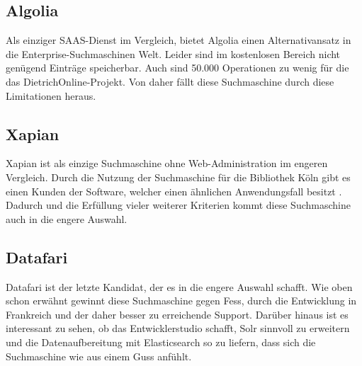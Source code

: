 \subsection{Algolia}

Als einziger SAAS-Dienst im Vergleich, bietet Algolia einen Alternativansatz in die Enterprise-Suchmaschinen Welt. Leider sind im kostenlosen Bereich nicht genügend Einträge speicherbar. Auch sind 50.000 Operationen zu wenig für die das DietrichOnline-Projekt. Von daher fällt diese Suchmaschine durch diese Limitationen heraus. \cite{Algolia.2019}

\subsection{Xapian}

Xapian ist als einzige Suchmaschine ohne Web-Administration im engeren Vergleich. Durch die Nutzung der Suchmaschine für die Bibliothek Köln gibt es einen Kunden der Software, welcher einen ähnlichen Anwendungsfall besitzt \cite{Xapian.2019}. Dadurch und die Erfüllung vieler weiterer Kriterien kommt diese Suchmaschine auch in die engere Auswahl. \cite{XAP.2019}

\subsection{Datafari}

Datafari ist der letzte Kandidat, der es in die engere Auswahl schafft. Wie oben schon erwähnt gewinnt diese Suchmaschine gegen Fess, durch die Entwicklung in Frankreich und der daher besser zu erreichende Support. Darüber hinaus ist es interessant zu sehen, ob das Entwicklerstudio schafft, Solr sinnvoll zu erweitern und die Datenaufbereitung mit Elasticsearch so zu liefern, dass sich die Suchmaschine wie aus einem Guss anfühlt. \cite{Labs.b}